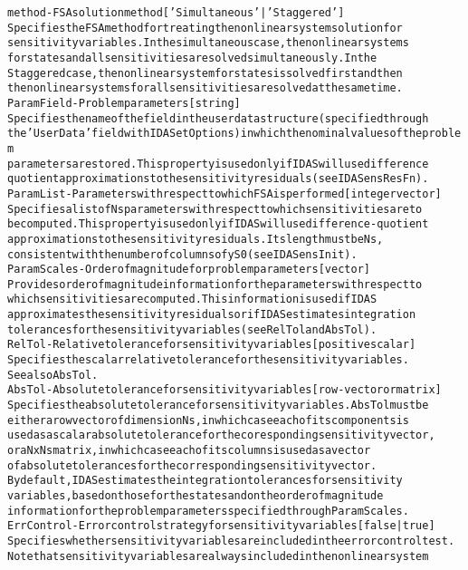\begin{alltt}
method - FSA solution method [ 'Simultaneous' | {'Staggered'} ]
   Specifies the FSA method for treating the nonlinear system solution for
   sensitivity variables. In the simultaneous case, the nonlinear systems
   for states and all sensitivities are solved simultaneously. In the
   Staggered case, the nonlinear system for states is solved first and then
   the nonlinear systems for all sensitivities are solved at the same time.
ParamField - Problem parameters  [ string ]
   Specifies the name of the field in the user data structure (specified through
   the 'UserData' field with IDASetOptions) in which the nominal values of the problem
   parameters are stored. This property is used only if  IDAS will use difference
   quotient approximations to the sensitivity residuals (see IDASensResFn).
ParamList - Parameters with respect to which FSA is performed [ integer vector ]
   Specifies a list of Ns parameters with respect to which sensitivities are to
   be computed. This property is used only if IDAS will use difference-quotient
   approximations to the sensitivity residuals. Its length must be Ns,
   consistent with the number of columns of yS0 (see IDASensInit).
ParamScales - Order of magnitude for problem parameters [ vector ]
   Provides order of magnitude information for the parameters with respect to
   which sensitivities are computed. This information is used if IDAS
   approximates the sensitivity residuals or if IDAS estimates integration
   tolerances for the sensitivity variables (see RelTol and AbsTol).
RelTol - Relative tolerance for sensitivity variables [ positive scalar ]
   Specifies the scalar relative tolerance for the sensitivity variables.
   See also AbsTol.
AbsTol - Absolute tolerance for sensitivity variables [ row-vector or matrix ]
   Specifies the absolute tolerance for sensitivity variables. AbsTol must be
   either a row vector of dimension Ns, in which case each of its components is
   used as a scalar absolute tolerance for the coresponding sensitivity vector,
   or a N x Ns matrix, in which case each of its columns is used as a vector
   of absolute tolerances for the corresponding sensitivity vector.
   By default, IDAS estimates the integration tolerances for sensitivity
   variables, based on those for the states and on the order of magnitude
   information for the problem parameters specified through ParamScales.
ErrControl - Error control strategy for sensitivity variables [ false | {true} ]
   Specifies whether sensitivity variables are included in the error control test.
   Note that sensitivity variables are always included in the nonlinear system

\end{alltt}
